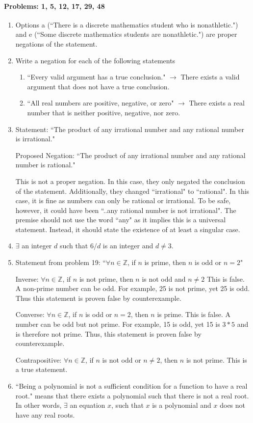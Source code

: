 \documentclass{article}
\makeatletter
\newcommand\setItemnumber[1]{\setcounter{enum\romannumeral\@enumdepth}{\numexpr#1-1\relax}}
\makeatother
\begin{document}
\paragraph{Problems: 1, 5, 12, 17, 29, 48}
\begin{enumerate}
    \item Options a (``There is a discrete mathematics student who is nonathletic.") and e (``Some discrete mathematics students are nonathletic.") are proper negations of the statement.
    \setItemnumber{5}
    \item Write a negation for each of the following statements
    \begin{enumerate}
        \item ``Every valid argument has a true conclusion." $\rightarrow$ There exists a valid argument that does not have a true conclusion.
        \item ``All real numbers are positive, negative, or zero" $\rightarrow$ There exists a real number that is neither positive, negative, nor zero.
    \end{enumerate}
    \setItemnumber{12}
    \item Statement: ``The product of any irrational number and any rational number is irrational."

    Proposed Negation: ``The product of any irrational number and any rational number is rational."

    This is not a proper negation. In this case, they only negated the conclusion of the statement. Additionally, they changed ``irrational" to ``rational". In this case, it is fine as numbers can only be rational or irrational. To be safe, however, it could have been ``..any rational number is not irrational". The premise should not use the word ``any" as it implies this is a universal statement. Instead, it should state the existence of at least a singular case.
    \setItemnumber{17}
    \item $\exists$ an integer $d$ such that $6/d$ is an integer and $d\neq 3$.
    \setItemnumber{29}
    \item Statement from problem 19: ``$\forall n\in\mathbb{Z}$, if $n$ is prime, then $n$ is odd or $n=2$"

    Inverse: $\forall n\in\mathbb{Z}$, if $n$ is not prime, then $n$ is not odd and $n\neq2$ This is false. A non-prime number can be odd. For example, 25 is not prime, yet 25 is odd. Thus this statement is proven false by counterexample.

    Converse: $\forall n\in\mathbb{Z}$, if $n$ is odd or $n=2$, then $n$ is prime. This is false. A number can be odd but not prime. For example, 15 is odd, yet 15 is $3*5$ and is therefore not prime. Thus, this statement is proven false by counterexample.

    Contrapositive: $\forall n\in\mathbb{Z}$, if $n$ is not odd or $n\neq2$, then $n$ is not prime. This is a true statement.
    \setItemnumber{48}
    \item ``Being a polynomial is not a sufficient condition for a function to have a real root." means that there exists a polynomial such that there is not a real root. In other words, $\exists$ an equation $x$, such that $x$ is a polynomial and $x$ does not have any real roots.
\end{enumerate}
\end{document}
